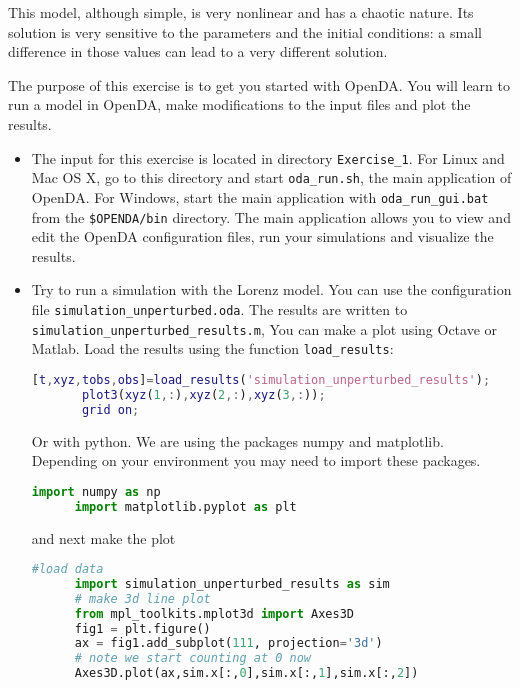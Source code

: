 \documentclass[a4paper,10pt]{article}
\begin{document}
This model, although simple, is very nonlinear and has a chaotic nature.  Its
solution is very sensitive to the parameters and the initial conditions: a
small difference in those values can lead to a very different solution.

The purpose of this exercise is to get you started with OpenDA. You will learn
to run a model in OpenDA, make modifications to the input files and plot the
results.

\begin{itemize}
\item The input for this exercise is located in directory {\tt Exercise\_1}.
      For Linux and Mac OS X, go to this directory and start {\tt oda\_run.sh}, the
      main application of OpenDA. For Windows, start the main application with 
      {\tt oda\_run\_gui.bat} from the {\tt \$OPENDA/bin} directory. The main 
      application allows you to view and edit the OpenDA configuration files, run your
      simulations and visualize the results.
\item Try to run a simulation with the Lorenz model. You can use the
      configuration file {\tt simulation\_unperturbed.oda}. The results are
      written to {\tt simulation\_unperturbed\_results.m}, You can make a
      plot using Octave or Matlab. Load the results using the function
      {\tt load\_results}:
      \begin{lstlisting}[language=Matlab,frame=single,caption={Matlab}]
       [t,xyz,tobs,obs]=load_results('simulation_unperturbed_results');
       plot3(xyz(1,:),xyz(2,:),xyz(3,:));
       grid on;
      \end{lstlisting}
      Or with python. We are using the packages numpy and matplotlib. Depending
      on your environment you may need to import these packages.
      \begin{lstlisting}[language=Python,frame=single,caption={Python initialize}]
      import numpy as np
      import matplotlib.pyplot as plt
      \end{lstlisting}
      and next make the plot
      \begin{lstlisting}[language=Python,frame=single,caption={Python}]
      #load data
      import simulation_unperturbed_results as sim
      # make 3d line plot
      from mpl_toolkits.mplot3d import Axes3D
      fig1 = plt.figure()
      ax = fig1.add_subplot(111, projection='3d')
      # note we start counting at 0 now
      Axes3D.plot(ax,sim.x[:,0],sim.x[:,1],sim.x[:,2])
      \end{lstlisting}
      

\end{itemize}
\end{document}
